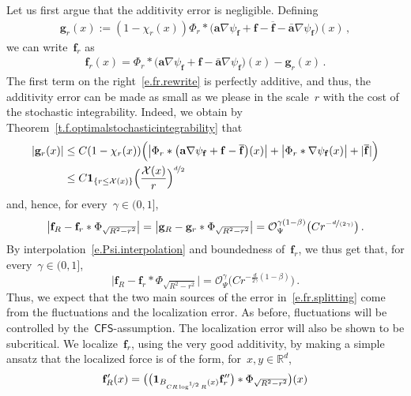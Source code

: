\documentclass[11pt,twoside]{article} %
\numberwithin{equation}{section}
\theoremstyle{definition}
\newcommand*{\R}{\ensuremath{\mathbb{R}}}
\newcommand{\g}{\mathbf{g}}
\newcommand{\f}{\mathbf{f}}
\renewcommand{\a}{\mathbf{a}}
\newcommand{\ahom}{\bar{\a}}
\newcommand{\X}{\mathcal{X}}
\renewcommand{\O}{\mathcal{O}}
\newcommand{\indc}{\boldsymbol{1}}
\newcommand{\CFS}{\mathsf{CFS}}
\begin{document}
\smallskip




Let us first argue that the additivity error is negligible. Defining 
\begin{align*}  
\g_r(x) := (1-\chi_r(x)) \Phi_r \ast  \bigl( \a \nabla \psi_{\f} + \f - \overline{\f} - \ahom \nabla \psi_{\f}   \bigr) (x)   \,,
\end{align*}
we can write~$\f_r$ as
\begin{align}  \label{e.fr.rewrite}
\f_r(x) = \Phi_r \ast  \bigl( \a \nabla \psi_{\f} + \f - \ahom \nabla \psi_{\f}   \bigr) (x)  - \g_r(x)  \,.
\end{align}
The first term on the right~\eqref{e.fr.rewrite} is perfectly additive, and thus, the additivity error can be made as small as we please in the scale~$r$ with the cost of the stochastic integrability. Indeed, we obtain by Theorem~\ref{t.f.optimalstochasticintegrability} that
\begin{align} \notag \label{e.gr.est}
| \g_r(x) | 
& 
\leq 
C(1-\chi_r(x)) \Bigl( \bigl| \Phi_r \ast  \bigl( \a \nabla \psi_{\f} + \f - \overline{\f}  \bigr)(x)\bigr| + \bigl| \Phi_r \ast  \nabla \psi_{\f}(x)\bigr|  + | \overline{\f} |  \Bigr)
 \\  &
\leq
C \indc_{\{ r \leq \X(x)\} } \Bigl( \frac{\X(x)}{r} \Bigl)^{\nicefrac d2}
\end{align}
and, hence, for every~$\gamma \in (0,1]$, 
\begin{align}  \label{e.fr.add}
\big| \f_R - \f_r \ast \Phi_{\sqrt{R^2-r^2}} \big|
=
\big| \g_R - \g_r \ast \Phi_{\sqrt{R^2-r^2}} \big| 
= 
\O_\Psi^{\gamma (1-\beta)} \bigl( C r^{-\nicefrac{d}{(2\gamma)}} \bigr)  \,.
\end{align}
By interpolation~\eqref{e.Psi.interpolation} and boundedness of~$\f_r$, we thus get that, for every~$\gamma \in (0,1]$, 
\begin{equation}  \label{e.fr.additivity}
\big| \f_R - \f_r \ast \Phi_{\sqrt{R^2-r^2}} \big| = \O_\Psi^{\gamma} \bigl( C r^{-\frac{d}{2\gamma}(1-\beta)} \bigr) \,.
\end{equation}
Thus, we expect that the two main sources of the error in~\eqref{e.fr.splitting} come from the fluctuations and the localization error. As before, fluctuations will be controlled by the~$\CFS$-assumption. The localization error will also be shown to be subcritical. We  localize~$\f_r$, using the very good additivity, by making a simple ansatz that the localized force is of the form, for~$x,y \in \R^d$, 
\begin{equation*}  
\f'_{R}(x)  =  \bigl( \bigl( \indc_{B_{C R \log^{\nicefrac12} R }(x)} \f_r'' \bigr) \ast  \Phi_{\sqrt{R^2-r^2}} \bigr) (x)
\end{equation*}
\end{document}
